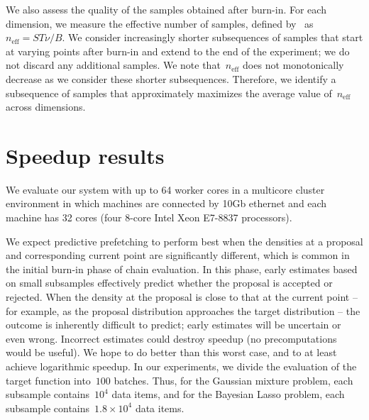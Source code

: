 \documentclass[angelino.tex]{subfiles}
\begin{document}
We also assess the quality of the samples obtained after burn-in.
For each dimension, we measure the effective number of samples,
defined by~\citet{gelman:1993-bda} as~${n_\text{eff} = ST \nu / B}$.
We consider increasingly shorter subsequences of samples that start at varying
points after burn-in and extend to the end of the experiment;
we do not discard any additional samples.
We note that~$n_\text{eff}$ does not monotonically decrease as we consider
these shorter subsequences.
Therefore, we identify a subsequence of samples that approximately maximizes
the average value of~$n_\text{eff}$ across dimensions.

\section{Speedup results}
\label{sec:results}

We evaluate our system with up to 64 worker cores in a multicore cluster environment in which 
machines are connected by 10Gb ethernet and each machine has 32 cores
(four 8-core Intel Xeon E7-8837 processors).

We expect predictive prefetching to perform best when the densities at a proposal and corresponding current point are significantly different, which is common in the initial burn-in phase of chain evaluation.
%
In this phase, early estimates based on small subsamples effectively predict whether the proposal is accepted or rejected.
%
When the density at the proposal is close to that at the current point -- for example, as the proposal distribution approaches the target distribution -- the outcome is inherently difficult to predict; early estimates will be uncertain or even wrong.
%
Incorrect estimates could destroy speedup (no precomputations would be useful). We hope to do better than this worst case, and to at least achieve logarithmic speedup.
%
In our experiments, we divide the evaluation of the target
function into~$100$ batches.
%
Thus, for the Gaussian mixture problem, each subsample contains~$10^4$ data items, and for the Bayesian Lasso problem, each subsample contains~$1.8 \times 10^4$ data items.
\end{document}
